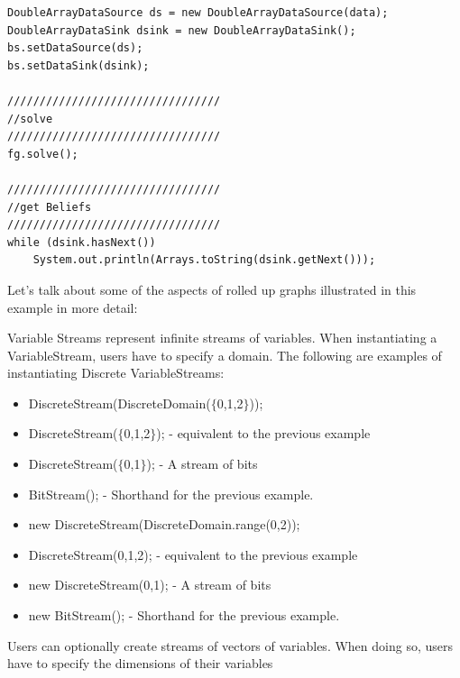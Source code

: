 \begin{lstlisting}
DoubleArrayDataSource ds = new DoubleArrayDataSource(data);
DoubleArrayDataSink dsink = new DoubleArrayDataSink();
bs.setDataSource(ds);
bs.setDataSink(dsink);

/////////////////////////////////                                                                                             
//solve 
/////////////////////////////////                                                                                             
fg.solve();

/////////////////////////////////                                                                                             
//get Beliefs
/////////////////////////////////
while (dsink.hasNext())
	System.out.println(Arrays.toString(dsink.getNext()));
\end{lstlisting}
\fi


Let's talk about some of the aspects of rolled up graphs illustrated in this example in more detail:


Variable Streams represent infinite streams of variables.  When instantiating a VariableStream, users have to specify a domain.  The following are examples of instantiating Discrete VariableStreams:

\ifmatlab
\begin{itemize}
\item DiscreteStream(DiscreteDomain($\{$0,1,2$\}$));
\item DiscreteStream($\{$0,1,2$\}$); - equivalent to the previous example
\item DiscreteStream($\{$0,1$\}$); - A stream of bits
\item BitStream(); - Shorthand for the previous example.
\end{itemize}
\fi

\ifjava
\begin{itemize}
\item new DiscreteStream(DiscreteDomain.range(0,2));
\item DiscreteStream(0,1,2); - equivalent to the previous example
\item new DiscreteStream(0,1); - A stream of bits
\item new BitStream(); - Shorthand for the previous example.
\end{itemize}
\fi

\ifmatlab

Users can optionally create streams of vectors of variables.  When doing so, users have to specify the dimensions of their variables

